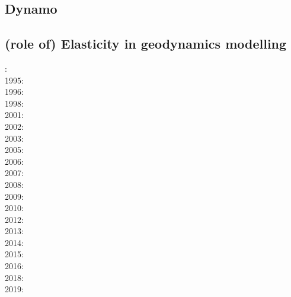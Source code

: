 \subsection{Dynamo}






\subsection{(role of) Elasticity in geodynamics modelling}

{\scriptsize
{}:\cite{yusa84}\\
1995:\cite{budi95}\\
1996:\cite{hach96}\\
1998:\cite{copo98}\\
2001:\cite{vapy01}\\
2002:\cite{mumh02}\cite{modm02}\\
2003:\cite{hukm03}\cite{wabu03}\\
2005:\cite{mure05}\\
2006:\cite{kapo06}\cite{mudm06}\\
2007:\cite{kabe07}\\
2008:\cite{baso08}\cite{fukk08}\\
2009:\cite{qurj09}\\
2010:\cite{bepo10}\\
2012:\cite{gerb12}\cite{kasc12}\\
2013:\cite{wahd13}\\
2014:\cite{famc14}\cite{fogm14}\\
2015:\cite{thkp15}\\
2016:\cite{bafl16}\cite{jads16}\cite{olbm16}\cite{bafl16}\\
2018:\cite{dusd18}\\
2019:\cite{pact19}
}


